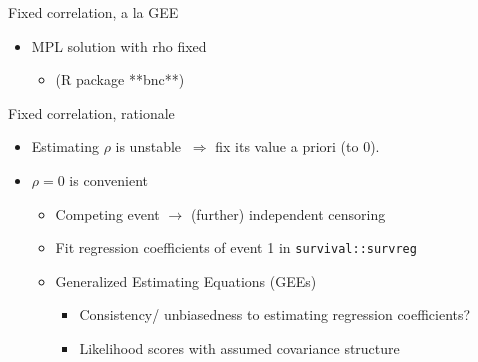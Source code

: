 \documentclass[10pt]{beamer}
\providecommand{\tightlist}{%
\setlength{\itemsep}{0pt}\setlength{\parskip}{0pt}}
\begin{document}
\begin{frame}[fragile]{Fixed correlation, a la GEE}
\protect\hypertarget{fixed-correlation-a-la-gee}{}

\begin{itemize}
\tightlist
\item
  MPL solution with rho fixed
  \begin{itemize}
      \item \cite{AndersonOlkin1985} (R package **bnc**)
  \end{itemize}
\end{itemize}




\begin{block}{Fixed correlation, rationale}

\begin{itemize}
\tightlist
\item
  Estimating \(\rho\) is unstable \(\ \Rightarrow\) fix its value a priori (to 0).
\item
  \(\rho=0\) is convenient

  \begin{itemize}
  \tightlist
  \item
    Competing event \(\to\) (further) independent censoring
  \item
    Fit regression coefficients of event 1 in
    \texttt{survival::survreg}
  \item
    Generalized Estimating Equations (GEEs)

    \begin{itemize}
    \tightlist
    \item
      Consistency/ unbiasedness to estimating regression coefficients?
    \item
      Likelihood scores with assumed covariance structure
    \end{itemize}
  \end{itemize}
\end{itemize}
\end{block}

\end{frame}
\end{document}
